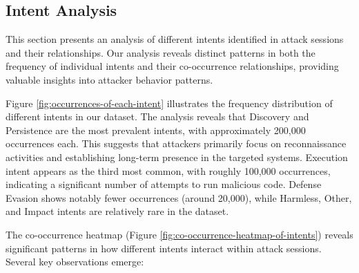     \vspace{-0.3cm}

    \subsection{Intent Analysis}
    
        This section presents an analysis of different intents identified in attack sessions and their relationships. Our analysis reveals distinct patterns in both the frequency of individual intents and their co-occurrence relationships, providing valuable insights into attacker behavior patterns.

        Figure \ref{fig:occurrences-of-each-intent} illustrates the frequency distribution of different intents in our dataset. The analysis reveals that Discovery and Persistence are the most prevalent intents, with approximately 200,000 occurrences each. This suggests that attackers primarily focus on reconnaissance activities and establishing long-term presence in the targeted systems. Execution intent appears as the third most common, with roughly 100,000 occurrences, indicating a significant number of attempts to run malicious code. Defense Evasion shows notably fewer occurrences (around 20,000), while Harmless, Other, and Impact intents are relatively rare in the dataset.

        The co-occurrence heatmap (Figure \ref{fig:co-occurrence-heatmap-of-intents}) reveals significant patterns in how different intents interact within attack sessions. Several key observations emerge:
        
        \vspace{0.2em}

